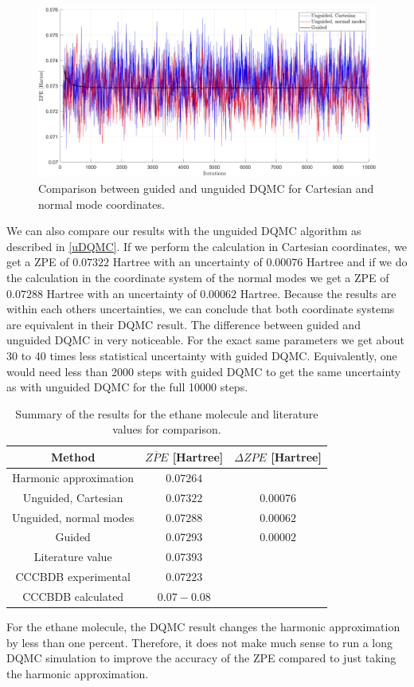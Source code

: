 \documentclass [12pt]{report}
\begin{document}
\begin{figure}[h!]
\includegraphics[width=\linewidth] {c2h6_2.png}
\caption{Comparison between guided and unguided DQMC for Cartesian and normal mode coordinates.} \label{c2h6_2}
\end{figure}
We can also compare our results with the unguided DQMC algorithm as described in \ref{uDQMC}. If we perform the calculation in Cartesian coordinates, we get a ZPE of $0.07322$ Hartree with an uncertainty of $0.00076$ Hartree and if we do the calculation in the coordinate system of the normal modes we get a ZPE of $0.07288$ Hartree with an uncertainty of $0.00062$ Hartree. Because the results are within each others uncertainties, we can conclude that both coordinate systems are equivalent in their DQMC result. The difference between guided and unguided DQMC in very noticeable. For the exact same parameters we get about 30 to 40 times less statistical uncertainty with guided DQMC. Equivalently, one would need less than 2000 steps with guided DQMC to get the same uncertainty as with unguided DQMC for the full 10000 steps.

\begin{table}[h]
\centering
 \begin{tabular}{||c | c | c||} 
 \hline
 Method & $\overline{ZPE}$ [Hartree] & $\Delta ZPE$ [Hartree] \\ [0.5ex] 
 \hline\hline
 Harmonic approximation & $0.07264$ & \\
 \hline
 Unguided, Cartesian & $0.07322$ &  $0.00076$\\
  \hline
 Unguided, normal modes & $0.07288$ &  $0.00062$\\
 \hline
 Guided & $0.07293$ & $0.00002$ \\
 \hline
 Literature value \cite{c2h6} & $0.07393$ &\\
 \hline
 CCCBDB experimental \cite{cccbdb} & $0.07223$ & \\
 \hline
 CCCBDB calculated \cite{cccbdb} & $0.07 - 0.08$ & \\
 \hline
\end{tabular}
\caption{Summary of the results for the ethane molecule and literature values for comparison.}
\end{table}
For the ethane molecule, the DQMC result  changes the harmonic approximation by less than one percent. Therefore, it does not make much sense to run a long DQMC simulation to improve the accuracy of the ZPE compared to just taking the harmonic approximation.
\end{document}
